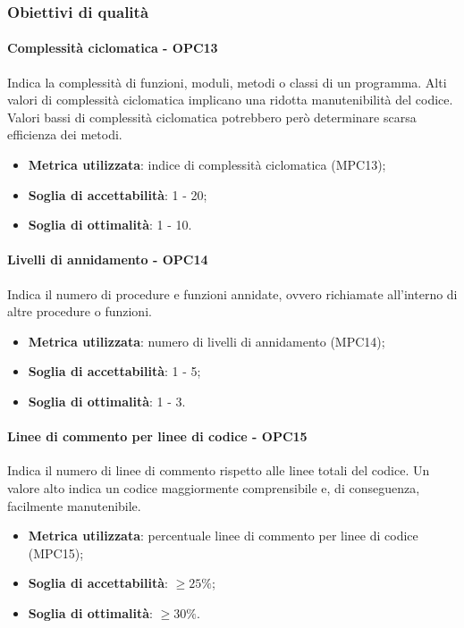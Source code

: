 \documentclass[PdQ.tex]{subfiles}
\begin{document}
		\subsubsection{Obiettivi di qualità}
			\paragraph{Complessità ciclomatica - OPC13}
				Indica la complessità di funzioni, moduli, metodi o classi di un programma. Alti valori di complessità
				ciclomatica implicano una ridotta manutenibilità del codice. Valori bassi di complessità ciclomatica potrebbero
				però determinare scarsa efficienza dei metodi.
				\begin{itemize}
					\item \textbf{Metrica utilizzata}: indice di complessità ciclomatica (MPC13);
					\item \textbf{Soglia di accettabilità}: 1 - 20;
					\item \textbf{Soglia di ottimalità}: 1 - 10.
				\end{itemize}
			
			\paragraph{Livelli di annidamento - OPC14}
				Indica il numero di procedure e funzioni annidate, ovvero richiamate all'interno di altre procedure o funzioni.
				\begin{itemize}
					\item \textbf{Metrica utilizzata}: numero di livelli di annidamento (MPC14);
					\item \textbf{Soglia di accettabilità}: 1 - 5;
					\item \textbf{Soglia di ottimalità}: 1 - 3.
				\end{itemize}
			
			\paragraph{Linee di commento per linee di codice - OPC15}
				Indica il numero di linee di commento rispetto alle linee totali del codice. Un valore alto indica un codice maggiormente comprensibile
				e, di conseguenza, facilmente manutenibile.
				\begin{itemize}
					\item \textbf{Metrica utilizzata}: percentuale linee di commento per linee di codice (MPC15);
					\item \textbf{Soglia di accettabilità}: \begin{math} \geq 25\% \end{math};
					\item \textbf{Soglia di ottimalità}: \begin{math} \geq 30\% \end{math}.
				\end{itemize}
			
\end{document}
